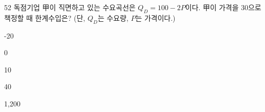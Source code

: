\begin{question}{52}
독점기업 甲이 직면하고 있는 수요곡선은 $Q_D = 100 - 2P$이다. 甲이 가격을 30으로 책정할 때 한계수입은? (단, $Q_D$는 수요량, $P$는 가격이다.)
\begin{choices}
  \item -20
  \item 0
  \item 10
  \item 40
  \item 1,200
\end{choices}
\end{question}
